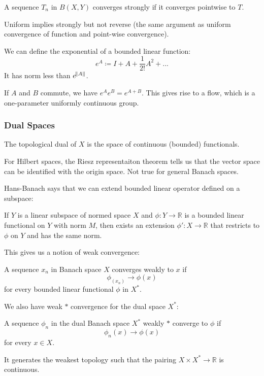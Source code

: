 \documentclass[main.tex]{subfiles}
\begin{document}
\begin{definition}
A sequence $T_n$ in $B(X,Y)$ converges strongly if it converges pointwise to $T$.
\end{definition}
Uniform implies strongly but not reverse (the same argument as uniform convergence of function and point-wise convergence).

We can define the exponential of a bounded linear function:
$$
e^A \coloneqq I + A + \frac{1}{2!}A^2 + ...
$$
It has norm less than $e^{\norm{A}}$.

If $A$ and $B$ commute, we have $e^A e^B = e^{A + B}$. This gives rise to a flow, which is a one-parameter uniformly continuous group. 


\subsubsection{Dual Spaces}
The topological dual of $X$ is the space of continuous (bounded) functionals.

For Hilbert spaces, the Riesz representaiton theorem tells us that the vector space can be identified with the origin space. Not true for general Banach spaces.

Hans-Banach says that we can extend bounded linear operator defined on a subspace:

\begin{theorem}
If $Y$ is a linear subspace of normed space $X$ and $\phi: Y \rightarrow \mathbb{R}$ is a bounded linear functional on $Y$ with norm $M$, then exists an extension $\phi': X \rightarrow \mathbb{R}$ that restricts to $\phi$ on $Y$ and has the same norm.
\end{theorem}

This gives us a notion of weak convergence:
\begin{definition}
A sequence $x_n$ in Banach space $X$ converges weakly to $x$ if 
$$
\phi_(x_n) \rightarrow \phi(x)
$$
for every bounded linear functional $\phi$ in $X^*$.
\end{definition}

We also have weak $*$ convergence for the dual space $X^*$:
\begin{definition}
A sequence $\phi_n$ in the dual Banach space $X^*$ weakly $*$ converge to $\phi$ if
$$
\phi_n(x) \rightarrow \phi(x)
$$
for every $x \in X$.
\end{definition}
It generates the weakest topology such that the pairing $X \times X^* \rightarrow \mathbb{R}$ is continuous.
\end{document}
